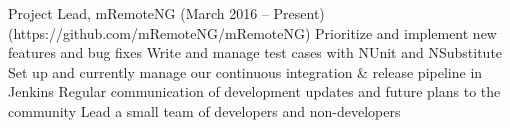 Project Lead, mRemoteNG (March 2016 – Present)
(https://github.com/mRemoteNG/mRemoteNG)
Prioritize and implement new features and bug fixes
Write and manage test cases with NUnit and NSubstitute
Set up and currently manage our continuous integration & release pipeline in Jenkins
Regular communication of development updates and future plans to the community
Lead a small team of developers and non-developers